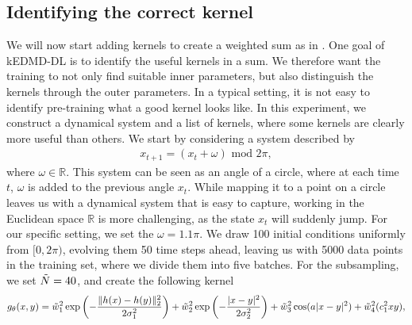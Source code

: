 \documentclass{article}
\begin{document}
\subsection{Identifying the correct kernel}\label{sec:exp2}
We will now start adding kernels to create a weighted sum as in . One goal of kEDMD-DL is to identify the useful kernels in a sum. We therefore want the training to not only find suitable inner parameters, but also distinguish the kernels through the outer parameters. In a typical setting, it is not easy to identify pre-training what a good kernel looks like. In this experiment, we construct a dynamical system and a list of kernels, where some kernels are clearly more useful than others. We start by considering a system described by
\begin{align}\label{eq:modulo_sys}
    x_{t+1} = (x_{t} + \omega) \text{ mod } 2\pi,
\end{align}
where \(\omega \in \mathbb{R}\). This system can be seen as an angle of a circle, where at each time \(t\), \(\omega\) is added to the previous angle \(x_{t}\). While mapping it to a point on a circle leaves us with a dynamical system that is easy to capture, working in the Euclidean space \(\mathbb{R}\) is more challenging, as the state \(x_{t}\) will suddenly jump. For our specific setting, we set the \(\omega = 1.1\pi\). We draw 100 initial conditions uniformly from \([0, 2\pi)\), evolving them 50 time steps ahead, leaving us with 5000 data points in the training set, where we divide them into five batches. For the subsampling, we set \(\Tilde N = 40\), and create the following kernel
\begin{align*}
    g_{\theta}(x,y) = \Tilde w_{1}^2 \exp\left(-\frac{\lVert h(x)-h(y)\rVert^2_2}{2\sigma_{1}^2}\right) + \Tilde w_{2}^2 \exp\left(-\frac{\lvert x-y\rvert^2}{2\sigma_{2}^2}\right) + \Tilde w_3^2 \cos(a \lvert x-y \rvert^2) + \Tilde w_4^2 (c_1^2 xy),
\end{align*}
\end{document}
